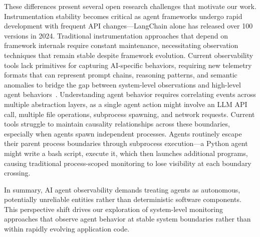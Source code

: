 These differences present several open research challenges that motivate our work. Instrumentation stability becomes critical as agent frameworks undergo rapid development with frequent API changes—LangChain alone has released over 100 versions in 2024. Traditional instrumentation approaches that depend on framework internals require constant maintenance, necessitating observation techniques that remain stable despite framework evolution. Current observability tools lack primitives for capturing AI-specific behaviors, requiring new telemetry formats that can represent prompt chains, reasoning patterns, and semantic anomalies to bridge the gap between system-level observations and high-level agent behaviors~\cite{semconv}. Understanding agent behavior requires correlating events across multiple abstraction layers, as a single agent action might involve an LLM API call, multiple file operations, subprocess spawning, and network requests. Current tools struggle to maintain causality relationships across these boundaries, especially when agents spawn independent processes. Agents routinely escape their parent process boundaries through subprocess execution—a Python agent might write a bash script, execute it, which then launches additional programs, causing traditional process-scoped monitoring to lose visibility at each boundary crossing.

In summary, AI agent observability demands treating agents as autonomous, potentially unreliable entities rather than deterministic software components. This perspective shift drives our exploration of system-level monitoring approaches that observe agent behavior at stable system boundaries rather than within rapidly evolving application code.